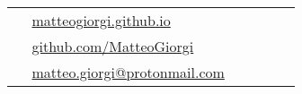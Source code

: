 \documentclass[10pt]{article} %
\begin{document}
\begin{paracol}{2}


\switchcolumn %


\parbox[top][0.12\textheight][c]{\linewidth}{ %
	\vspace{-0.04\textheight} %
	\colorbox{shade}{ %
		\begin{supertabular}{p{0.05\linewidth}|p{0.775\linewidth}} %
			\raisebox{-1pt}{\small\faHome} & \href{https://matteogiorgi.github.io}{matteogiorgi.github.io} \\ %
			\raisebox{-1pt}{\faGithub} & \href{https://github.com/MatteoGiorgi}{github.com/MatteoGiorgi} \\ %
			\raisebox{0pt}{\small\faEnvelope} & \href{mailto:matteo.giorgi@protonmail.com}{matteo.giorgi@protonmail.com} \\ %
		\end{supertabular}
	}
}



\end{paracol}
\end{document}
